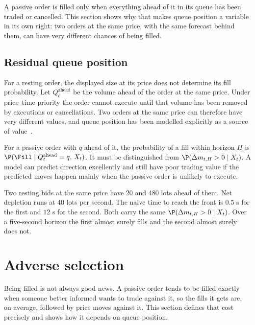 A passive order is filled only when everything ahead of it in its queue has been traded or
cancelled. This section shows why that makes queue position a variable in its own right: two orders
at the same price, with the same forecast behind them, can have very different chances of being
filled.

\subsection{Residual queue position}

For a resting order, the displayed size at its price does not determine its fill probability. Let
$Q^{\text{ahead}}_t$ be the volume ahead of the order at the same price. Under price--time
priority the order cannot execute until that volume has been removed by executions or
cancellations. Two orders at the same price can therefore have very different values, and queue
position has been modelled explicitly as a source of value~\citep{moallemi2017}.

For a passive order with $q$ ahead of it, the probability of a fill within horizon $H$ is
$\P(\Fill \mid Q^{\text{ahead}}_t = q,\, X_t)$. It must be distinguished from
$\P(\Delta m_{t,H} > 0 \mid X_t)$. A model can predict direction excellently and still have poor
trading value if the predicted moves happen mainly when the passive order is unlikely to execute.

\begin{example}
\label{ex:queue}
Two resting bids at the same price have 20 and 480 lots ahead of them. Net depletion runs at 40
lots per second. The naive time to reach the front is $0.5$ s for the first and $12$ s for the
second. Both carry the same $\P(\Delta m_{t,H} > 0 \mid X_t)$. Over a five-second horizon the first
almost surely fills and the second almost surely does not.
\end{example}

\section{Adverse selection}
\label{sec:adverse}

Being filled is not always good news. A passive order tends to be filled exactly when someone better
informed wants to trade against it, so the fills it gets are, on average, followed by price moves
against it. This section defines that cost precisely and shows how it depends on queue position.

